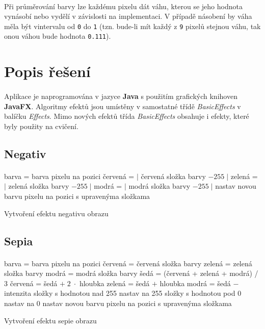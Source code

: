 \documentclass[12pt]{scrartcl}
\begin{document}
\paragraph{}
Při průměrování barvy lze každému pixelu dát váhu, kterou se jeho hodnota vynásobí nebo vydělí v závislosti na implementaci. V případě násobení by váha měla být v\nobreakspace intervalu od \texttt{0} do \texttt{1} (tzn. bude-li mít každý z \texttt{9} pixelů stejnou váhu, tak onou váhou bude hodnota \texttt{0.111}).

\section{Popis řešení}

\paragraph{}
Aplikace je naprogramována v jazyce \textbf{Java} s použitím grafických knihoven \textbf{JavaFX}. Algoritmy efektů jsou umístěny v samostatné třídě \emph{BasicEffects} v balíčku \emph{Effects}. Mimo nových efektů třída \emph{BasicEffects} obsahuje i efekty, které byly použity na cvičení.

\subsection{Negativ}
\paragraph{}
\begin{algorithm}[H]
	 {
		 {
			barva = barva pixelu na pozici\;
			červená = $|$ červená složka barvy $-255\; |$\;
			zelená = $|$ zelená složka barvy $-255\; |$\;
			modrá = $|$ modrá složka barvy $-255\; |$\;
			nastav novou barvu pixelu na pozici s upravenýma složkama\;
		}
	}
 \caption{Vytvoření efektu negativu obrazu}
\end{algorithm}

\subsection{Sepia}
\paragraph{}
\begin{algorithm}[H]
	 {
		 {
			barva = barva pixelu na pozici\;
			červená = červená složka barvy\;
			zelená = zelená složka barvy\;
			modrá = modrá složka barvy\;
			šedá = (červená + zelená + modrá) / 3\;
			červená = šedá $+\; 2\; \cdot $ hloubka\;
			zelená = šedá $+$ hloubka\;
			modrá = šedá $-$ intenzita\;
			složky s hodnotou nad 255 nastav na 255\;
			složky s hodnotou pod 0 nastav na 0\;
			nastav novou barvu pixelu na pozici s upravenýma složkama\;
		}
	}
 \caption{Vytvoření efektu sepie obrazu}
\end{algorithm}
\end{document}
